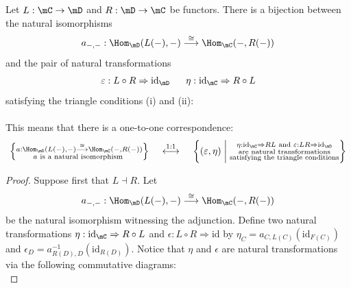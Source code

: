 \documentclass[a4paper]{article}
\begin{document}
\begin{prp}{}{} Let $L:\mC\to\mD$ and $R:\mD\to\mC$ be functors. There is a bijection between the natural isomorphisms $$a_{-,-}:\Hom_\mD(L(-),-)\overset{\cong}{\longrightarrow}\Hom_\mC(-,R(-))$$ and the pair of natural transformations $$\varepsilon:L\circ R\Rightarrow\text{id}_\mD\;\;\;\;\;\;\eta:\text{id}_\mC\Rightarrow R\circ L$$ satisfying the triangle conditions (i) and (ii): \\
 \\
This means that there is a one-to-one correspondence: $$\left\{\substack{a:\Hom_\mD(L(-),-)\overset{\cong}{\longrightarrow}\Hom_\mC(-,R(-))\\a\text{ is a natural isomorphism }}\right\}\;\;\;\;\overset{1:1}{\longleftrightarrow}\;\;\;\;\left\{(\varepsilon,\eta)\;\bigg{|}\;\substack{\eta:\text{id}_\mC\Rightarrow RL\text{ and }\varepsilon:LR\Rightarrow\text{id}_\mD\\\text{ are natural transformations }\\\text{satisfying the triangle conditions}}\right\}$$ 
\begin{proof}
Suppose first that $L\dashv R$. Let $$a_{-,-}:\Hom_\mD(L(-),-)\overset{\cong}{\longrightarrow}\Hom_\mC(-,R(-))$$ be the natural isomorphism witnessing the adjunction. Define two natural transformations $\eta:\text{id}_\mC\Rightarrow R\circ L$ and $\epsilon:L\circ R\Rightarrow\text{id}$ by $\eta_C=a_{C,L(C)}(\text{id}_{F(C)})$ and $\epsilon_D=a_{R(D),D}^{-1}(\text{id}_{R(D)})$. Notice that $\eta$ and $\epsilon$ are natural transformations via the following commutative diagrams: \\
\end{proof}
\end{prp}
\end{document}
